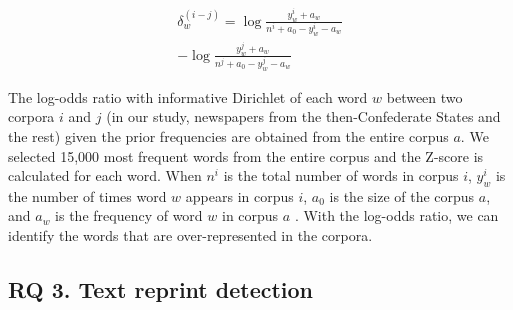 \documentclass[11pt]{article}
\begin{document}
\begin{equation}
\begin{aligned}
  \delta_{w}^{(i-j)} = \log \frac{y_{w}^{i}+a_{w}}{n^{i}+a_{0}-y_{w}^{i}-a_{w}} \\
  - \log \frac{y_{w}^{j}+a_{w}}{n^{j}+a_{0}-y_{w}^{j}-a_{w}}
\end{aligned}
\label{eq: log-odds ratio}
\end{equation}

The log-odds ratio with informative Dirichlet of each word 
$w$ between two corpora $i$ and $j$ (in our study, newspapers from the
then-Confederate States and the rest) given the prior frequencies are obtained from the entire 
corpus $a$. We selected 15,000 most frequent words from the entire corpus and the Z-score is calculated for each word.
When $n^{i}$ is the total number of words in corpus $i$,
$y_{w}^{i}$ is the number of times word $w$ appears in corpus $i$,
$a_{0}$ is the size of the corpus $a$, and
$a_{w}$ is the frequency of word $w$ in corpus $a$ \citep{kwak2020systematic}.
With the log-odds ratio, we can identify the words that are over-represented 
in the corpora.

\subsection{RQ 3. Text reprint detection}
\end{document}
